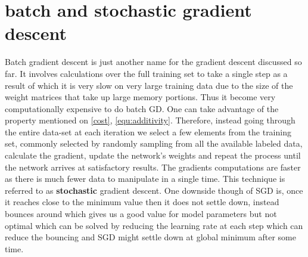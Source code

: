 \section{batch and stochastic gradient descent}

Batch gradient descent is just another name for the gradient descent discussed so far. It involves calculations over the full training set to take a single step as a result of which it is very slow on very large training data due to the size of the weight matrices that take up large memory portions. Thus it become very computationally expensive to do batch GD. One can take advantage of the property mentioned on \cref{cost}, \cref{equ:additivity}. Therefore, instead going through the entire data-set at each iteration we select a few elements from the
training set, commonly selected by randomly sampling from all the available labeled data, calculate the gradient, update the network's weights and repeat the process until the network arrives at satisfactory results. The gradients computations are faster as there is much fewer data to manipulate in a single time. This technique is referred to as \textbf{stochastic} gradient descent. One downside though of SGD is, once it reaches close to the minimum value then it does not settle down, instead bounces around which gives us a good value for model parameters but not optimal which can be solved by reducing the learning rate at each step which can reduce the bouncing and SGD might settle down at global minimum after some time.
